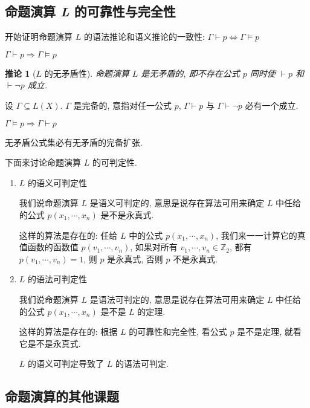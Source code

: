 \documentclass[
    color=black,
    device=normal,
    lang=cn
]{elegantnote}
\newtheorem{deduction}{推论}[subsection]
\begin{document}
\subsection{命题演算 \textit{L} 的可靠性与完全性}
开始证明命题演算 $L$ 的语法推论和语义推论的一致性: $\Gamma\vdash p\Leftrightarrow\Gamma\vDash p$
\begin{theorem}[$L$ 的可靠性]
    $\Gamma\vdash p\Rightarrow\Gamma\vDash p$
\end{theorem}
\begin{deduction}[$L$ 的无矛盾性]
    命题演算 $L$ 是无矛盾的, 即不存在公式 $p$ 同时使 $\vdash p$ 和 $\vdash \lnot p$ 成立.
\end{deduction}
\begin{definition}[公式集的完备性]
    设 $\Gamma\subseteq L(X)$. $\Gamma$ 是完备的, 意指对任一公式 $p$, $\Gamma\vdash p$ 与 $\Gamma\vdash\lnot p$ 必有一个成立.
\end{definition}
\begin{theorem}[$L$ 的完全性]
    $\Gamma\vDash p\Rightarrow \Gamma\vdash p$
\end{theorem}
\begin{proposition}
    无矛盾公式集必有无矛盾的完备扩张.
\end{proposition}
下面来讨论命题演算 $L$ 的可判定性.

\begin{enumerate}[label = $\arabic*^\circ$, listparindent = 2em, topsep = -1em]
    \item $L$ 的语义可判定性

          我们说命题演算 $L$ 是语义可判定的, 意思是说存在算法可用来确定 $L$ 中任给的公式 $p(x_1,\cdots,x_n)$ 是不是永真式.

          这样的算法是存在的: 任给 $L$ 中的公式 $p(x_1,\cdots,x_n)$, 我们来一一计算它的真值函数的函数值 $p(v_1, \cdots, v_n)$, 如果对所有 $v_1, \cdots,v_n\in\mathbb{Z}_2$, 都有 $p(v_1, \cdots, v_n) = 1$, 则 $p$ 是永真式, 否则 $p$ 不是永真式.
    \item $L$ 的语法可判定性

          我们说命题演算 $L$ 是语法可判定的, 意思是说存在算法可用来确定 $L$ 中任给的公式 $p(x_1,\cdots,x_n)$ 是不是 $L$ 的定理.

          这样的算法是存在的: 根据 $L$ 的可靠性和完全性, 看公式 $p$ 是不是定理, 就看它是不是永真式.

          $L$ 的语义可判定导致了 $L$ 的语法可判定.
\end{enumerate}
\subsection{命题演算的其他课题}
\end{document}
